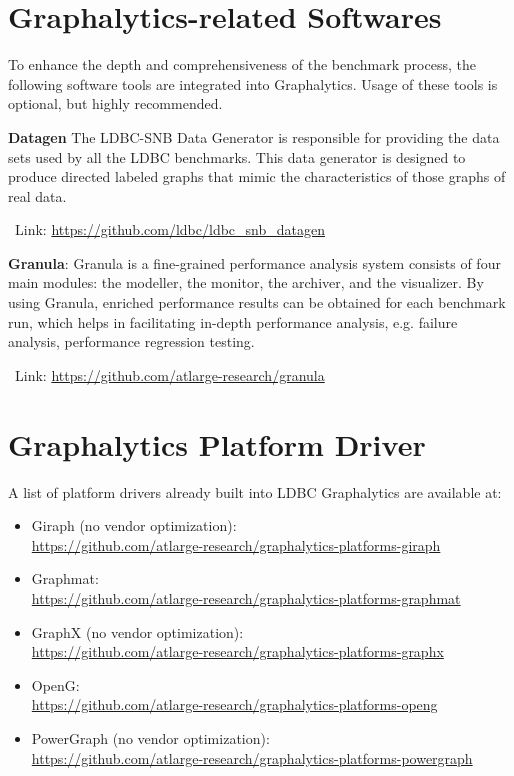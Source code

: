 \section{Graphalytics-related Softwares}\label{sec:instructions:related}
To enhance the depth and comprehensiveness of the benchmark process, the following software tools are integrated into Graphalytics. Usage of these tools is optional, but highly recommended.


\textbf{Datagen} The LDBC-SNB Data Generator is responsible for providing the data sets used by all the LDBC benchmarks. This data generator is designed to produce directed labeled graphs that mimic the characteristics of those graphs of real data. 

\-\ Link: \url{https://github.com/ldbc/ldbc_snb_datagen}



\textbf{Granula}:  Granula is a fine-grained performance analysis system consists of four main modules: the modeller, the monitor, the archiver, and the visualizer. 
By using Granula, enriched performance results can be obtained for each benchmark run, which helps in facilitating in-depth performance analysis, e.g. failure analysis, performance regression testing.

\-\ Link: \url{https://github.com/atlarge-research/granula}







\section{Graphalytics Platform Driver}\label{sec:instructions:drivers}
A list of platform drivers already built into LDBC Graphalytics are available at:

\begin{itemize}
  \item Giraph (no vendor optimization): \\\url{https://github.com/atlarge-research/graphalytics-platforms-giraph}
	\item Graphmat: \\\url{https://github.com/atlarge-research/graphalytics-platforms-graphmat}
	\item GraphX (no vendor optimization): \\\url{https://github.com/atlarge-research/graphalytics-platforms-graphx}
	\item OpenG: \\\url{https://github.com/atlarge-research/graphalytics-platforms-openg}
	\item PowerGraph (no vendor optimization): \\\url{https://github.com/atlarge-research/graphalytics-platforms-powergraph}
\end{itemize}

